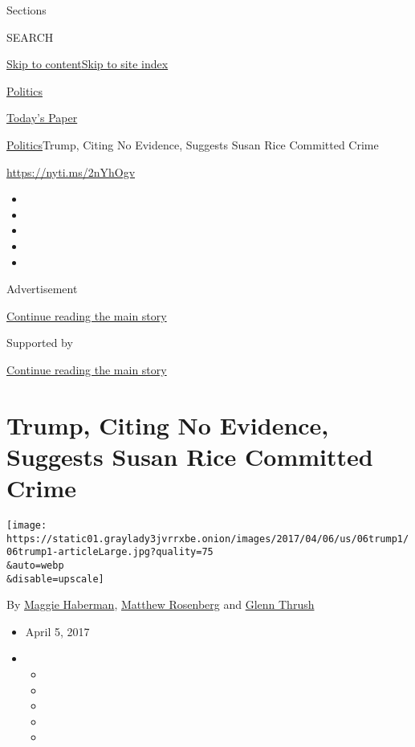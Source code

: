 Sections

SEARCH

\protect\hyperlink{site-content}{Skip to
content}\protect\hyperlink{site-index}{Skip to site index}

\href{https://www.nytimes3xbfgragh.onion/section/politics}{Politics}

\href{https://myaccount.nytimes3xbfgragh.onion/auth/login?response_type=cookie\&client_id=vi}{}

\href{https://www.nytimes3xbfgragh.onion/section/todayspaper}{Today's
Paper}

\href{/section/politics}{Politics}\textbar{}Trump, Citing No Evidence,
Suggests Susan Rice Committed Crime

\url{https://nyti.ms/2nYhOgv}

\begin{itemize}
\item
\item
\item
\item
\item
\end{itemize}

Advertisement

\protect\hyperlink{after-top}{Continue reading the main story}

Supported by

\protect\hyperlink{after-sponsor}{Continue reading the main story}

\hypertarget{trump-citing-no-evidence-suggests-susan-rice-committed-crime}{%
\section{Trump, Citing No Evidence, Suggests Susan Rice Committed
Crime}\label{trump-citing-no-evidence-suggests-susan-rice-committed-crime}}

\texttt{[image: https://static01.graylady3jvrrxbe.onion/images/2017/04/06/us/06trump1/06trump1-articleLarge.jpg?quality=75\\\&auto=webp\\\&disable=upscale]}

By \href{http://www.nytimes3xbfgragh.onion/by/maggie-haberman}{Maggie
Haberman},
\href{http://www.nytimes3xbfgragh.onion/by/matthew-rosenberg}{Matthew
Rosenberg} and
\href{https://www.nytimes3xbfgragh.onion/by/glenn-thrush}{Glenn Thrush}

\begin{itemize}
\item
  April 5, 2017
\item
  \begin{itemize}
  \item
  \item
  \item
  \item
  \item
  \end{itemize}
\end{itemize}

